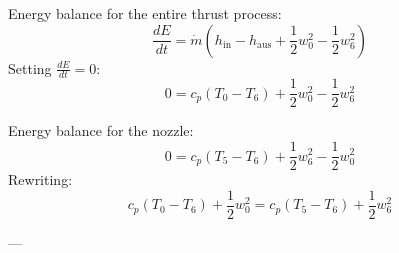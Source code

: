 Energy balance for the entire thrust process:  
\[ 
\frac{dE}{dt} = \dot{m} (h_{\text{in}} - h_{\text{aus}} + \frac{1}{2} w_0^2 - \frac{1}{2} w_6^2) 
\]  
Setting \( \frac{dE}{dt} = 0 \):  
\[ 
0 = c_p (T_0 - T_6) + \frac{1}{2} w_0^2 - \frac{1}{2} w_6^2 
\]  

Energy balance for the nozzle:  
\[ 
0 = c_p (T_5 - T_6) + \frac{1}{2} w_6^2 - \frac{1}{2} w_0^2 
\]  
Rewriting:  
\[ 
c_p (T_0 - T_6) + \frac{1}{2} w_0^2 = c_p (T_5 - T_6) + \frac{1}{2} w_6^2 
\]  

---
